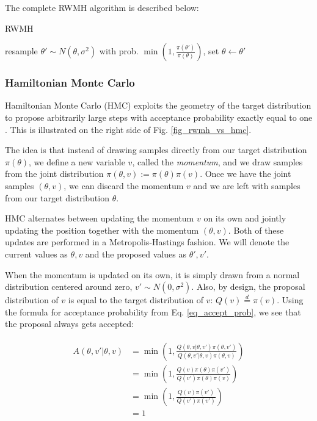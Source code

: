 \documentclass[12pt]{article}
\begin{document}
{The complete RWMH algorithm is described below:
\begin{algorithm}
\caption{RWMH}
\label{alg_rwmh}
\begin{algorithmic}
 
	\State resample $\theta' \sim N(\theta, \sigma^2)$ 
	\State with prob. $\min{(1, \frac{\pi(\theta')}{\pi(\theta)})}$, set $\theta \gets \theta'$ 
\EndFor
\end{algorithmic}
\end{algorithm}

\subsubsection{Hamiltonian Monte Carlo}

Hamiltonian Monte Carlo (HMC) exploits the geometry of the target distribution to propose arbitrarily large steps with acceptance probability exactly equal to one \cite{hmc}. This is illustrated on the right side of Fig. \ref{fig_rwmh_vs_hmc}.

The idea is that instead of drawing samples directly from our target distribution $\pi(\theta)$, we define a new variable $v$, called the \textit{momentum}, and we draw samples from the joint distribution $\pi(\theta, v) := \pi(\theta)\pi(v)$. Once we have the joint samples $(\theta, v)$, we can discard the momentum $v$ and we are left with samples from our target distribution $\theta$.

HMC alternates between updating the momentum $v$ on its own and jointly updating the position together with the momentum $(\theta, v)$. Both of these updates are performed in a Metropolis-Hastings fashion. We will denote the current values as $\theta, v$ and the proposed values as $\theta', v'$.

When the momentum is updated on its own, it is simply drawn from a normal distribution centered around zero, $v' \sim N(0, \sigma^2)$. Also, by design, the proposal distribution of $v$ is equal to the target distribution of $v$: $Q(v) \overset{d}{=} \pi(v)$. Using the formula for acceptance probability from Eq. \ref{eq_accept_prob}, we see that the proposal always gets accepted:

\begin{align}
\begin{split}
A(\theta,v'|\theta,v) &= \min \left(1, \frac{Q(\theta,v|\theta,v')\pi(\theta,v')}{Q(\theta,v'|\theta,v)\pi(\theta,v)} \right) \\
&= \min \left(1, \frac{Q(v)\pi(\theta)\pi(v')}{Q(v')\pi(\theta)\pi(v)} \right) \\
&= \min \left(1, \frac{Q(v)\pi(v')}{Q(v')\pi(v')} \right) \\
&= 1
\end{split}
\end{align}

}
\end{document}
